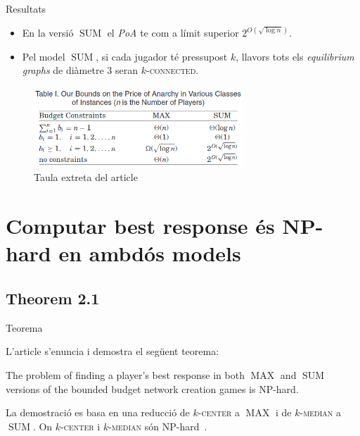 \documentclass[aspectratio=169]{beamer}
\DeclareMathOperator{\SUM}{SUM}
\DeclareMathOperator{\MAX}{MAX}
\newcommand{\kcenter}{\texorpdfstring{$k$}{k}-\textsc{center}\xspace}
\newcommand{\kmedian}{\texorpdfstring{$k$}{k}-\textsc{median}\xspace}
\begin{document}
\begin{frame}[allowframebreaks]{Resultats}
\begin{itemize}
    \vspace{1em}
    
    \item En la versió $\SUM$ el \emph{PoA} te com a límit superior $2^{O(\sqrt{\log n})}$.

    \vspace{1em}
    
    \item Pel model $\SUM$, si cada jugador té pressupost $k$, llavors tots els \emph{equilibrium graphs} de diàmetre $3$ seran $k$-\textsc{connected}.
    
    
    
\end{itemize}

\begin{figure}
\centering
\includegraphics[width=0.7\textwidth]{Table1_PoA_Bounds}
\caption{Taula extreta del article \cite{ehsani_bounded_2015}}
\end{figure}

\end{frame}


\section{Computar best response \'{e}s NP-hard en ambdós models}
\subsection{Theorem 2.1}
\begin{frame}{Teorema}

    L'article s'enuncia i demostra el següent teorema:
    
    \begin{theorem}
    The problem of finding a player's best response in both $\MAX$ and $\SUM$ versions of the bounded
    budget network creation games is NP-hard.
    \end{theorem}
    
    \vspace{2em}
    
    La demostració es basa en una reducció de \kcenter a $\MAX$ i de \kmedian a $\SUM$.
    On \kcenter i \kmedian són 
    NP-hard~\cite{hsu_easy_1979,lin_e-approximations_1992,megiddo_complexity_1984}.
    
\end{frame}
\end{document}
